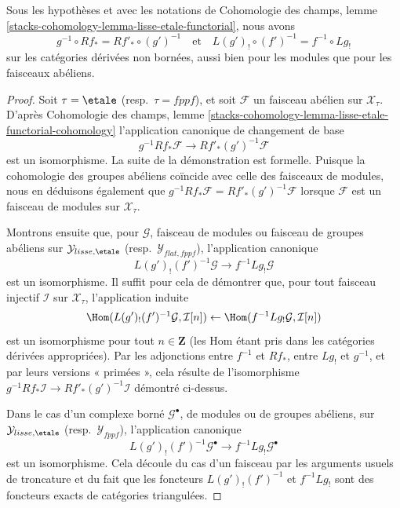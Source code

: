 \begin{lemma}
\label{lemma-lisse-etale-functorial-derived}
Sous les hypothèses et avec les notations de Cohomologie des champs, lemme
\ref{stacks-cohomology-lemma-lisse-etale-functorial}, nous avons
$$
g^{-1} \circ Rf_* = Rf'_* \circ (g')^{-1}
\quad\text{et}\quad
L(g')_! \circ (f')^{-1} = f^{-1} \circ Lg_!
$$
sur les catégories dérivées non bornées, aussi bien pour les modules que pour
les faisceaux abéliens.
\end{lemma}

\begin{proof}
Soit $\tau = \etale$ (resp.\ $\tau = fppf$), et soit $\mathcal{F}$ un faisceau
abélien sur $\mathcal{X}_\tau$. D'après Cohomologie des champs, lemme
\ref{stacks-cohomology-lemma-lisse-etale-functorial-cohomology}
l'application canonique de changement de base
$$
g^{-1}Rf_*\mathcal{F} \longrightarrow Rf'_*(g')^{-1}\mathcal{F}
$$
est un isomorphisme. La suite de la démonstration est formelle. Puisque la
cohomologie des groupes abéliens coïncide avec celle des faisceaux de modules,
nous en déduisons également que
$g^{-1} Rf_*\mathcal{F} = Rf'_* (g')^{-1}\mathcal{F}$ lorsque $\mathcal{F}$ est
un faisceau de modules sur $\mathcal{X}_\tau$.

\medskip\noindent
Montrons ensuite que, pour $\mathcal{G}$, faisceau de modules ou faisceau de
groupes abéliens sur $\mathcal{Y}_{lisse,\etale}$ (resp.\
$\mathcal{Y}_{flat,fppf}$), l'application canonique
$$
L(g')_!(f')^{-1}\mathcal{G} \to f^{-1}Lg_!\mathcal{G}
$$
est un isomorphisme. Il suffit pour cela de démontrer que, pour tout faisceau
injectif $\mathcal{I}$ sur $\mathcal{X}_\tau$, l'application induite
$$
\Hom(L(g')_!(f')^{-1}\mathcal{G}, \mathcal{I}[n])
\leftarrow
\Hom(f^{-1}Lg_!\mathcal{G}, \mathcal{I}[n])
$$
est un isomorphisme pour tout $n \in \mathbf{Z}$ (les Hom étant pris dans les
catégories dérivées appropriées). Par les adjonctions entre $f^{-1}$ et $Rf_*$,
entre $Lg_!$ et $g^{-1}$, et par leurs versions « primées », cela résulte de
l'isomorphisme
$g^{-1} Rf_*\mathcal{I} \to Rf'_* (g')^{-1}\mathcal{I}$ démontré ci-dessus.

\medskip\noindent
Dans le cas d'un complexe borné $\mathcal{G}^\bullet$, de modules ou de groupes
abéliens, sur $\mathcal{Y}_{lisse,\etale}$ (resp.\
$\mathcal{Y}_{fppf}$), l'application canonique
\begin{equation}
\label{equation-to-show}
L(g')_!(f')^{-1}\mathcal{G}^\bullet \to f^{-1}Lg_!\mathcal{G}^\bullet
\end{equation}
est un isomorphisme. Cela découle du cas d'un faisceau par les arguments usuels
de troncature et du fait que les foncteurs $L(g')_!(f')^{-1}$ et
$f^{-1}Lg_!$ sont des foncteurs exacts de catégories triangulées.


\end{proof}
